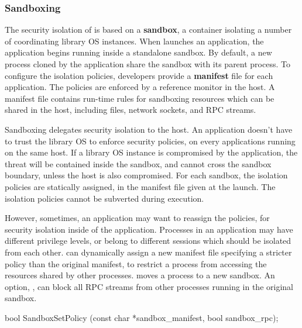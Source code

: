 \subsubsection*{Sandboxing}


The security isolation of \graphene{} is based on a {\bf sandbox}, a container isolating a number of coordinating library OS instances.
When \graphene{} launches an application, the application begins running inside a standalone sandbox.
By default, a new process cloned by the application share the sandbox
with its parent process.
To configure the isolation policies,
developers provide a {\bf manifest} file for each application.
The policies are enforced by a reference monitor in the host.
A manifest file contains run-time rules for sandboxing resources which can be shared in the host,
including files, network sockets, and RPC streams.



Sandboxing delegates
security isolation to the host.
An application doesn't have to trust the library OS
to enforce security policies,
on every applications running on the same host.
If a library OS instance is compromised by the application,
the threat will be contained inside the sandbox,
and cannot cross the sandbox boundary, unless the host is also compromised.
For each sandbox,
the isolation policies are statically assigned,
in the manifest file given at the launch.
The isolation policies
cannot be subverted during execution.



However, sometimes, an application may want to reassign the policies,
for security isolation inside of the application.
Processes in an application may have different privilege levels, or belong to different sessions which should be isolated from each other.
 can dynamically
assign a new manifest file specifying a stricter policy
than the original manifest,
to restrict a process from accessing the resources shared by other processes.
moves a process to a new sandbox.
An option, , can block all RPC streams from other processes running in the original sandbox.







\begin{paldef}
bool SandboxSetPolicy (const char *sandbox_manifest,
                       bool sandbox_rpc);
\end{paldef}



